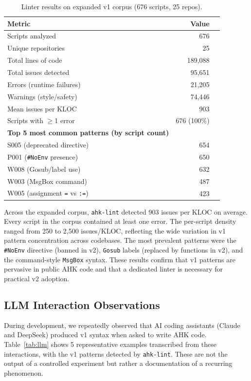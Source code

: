 \documentclass[11pt,a4paper]{article}
\begin{document}
\begin{enumerate}
\begin{table}[h]
\centering\small
\caption{Linter results on expanded v1 corpus (676 scripts, 25 repos).}
\label{tab:corpus_expanded}
\begin{tabular}{lrr}
\toprule
\textbf{Metric} & \textbf{Value} \\
\midrule
Scripts analyzed & 676 \\
Unique repositories & 25 \\
Total lines of code & 189,088 \\
Total issues detected & 95,651 \\
\quad Errors (runtime failures) & 21,205 \\
\quad Warnings (style/safety) & 74,446 \\
Mean issues per KLOC & 903 \\
Scripts with $\ge$1 error & 676 (100\%) \\
\midrule
\textbf{Top 5 most common patterns (by script count)} \\
\quad S005 (deprecated directive) & 654 \\
\quad P001 (\texttt{\#NoEnv} presence) & 650 \\
\quad W008 (Gosub/label use) & 632 \\
\quad W003 (MsgBox command) & 487 \\
\quad W005 (assignment \texttt{=} vs \texttt{:=}) & 423 \\
\bottomrule
\end{tabular}
\end{table}

Across the expanded corpus, \texttt{ahk-lint} detected 903 issues per KLOC on average. Every script in the corpus contained at least one error. The per-script density ranged from 250 to 2,500 issues/KLOC, reflecting the wide variation in v1 pattern concentration across codebases. The most prevalent patterns were the \texttt{\#NoEnv} directive (banned in v2), \texttt{Gosub} labels (replaced by functions in v2), and the command-style \texttt{MsgBox} syntax. These results confirm that v1 patterns are pervasive in public AHK code and that a dedicated linter is necessary for practical v2 adoption.

\subsection{LLM Interaction Observations}

During development, we repeatedly observed that AI coding assistants (Claude and DeepSeek) produced v1 syntax when asked to write AHK code. Table~\ref{tab:llm} shows 5 representative examples transcribed from these interactions, with the v1 patterns detected by \texttt{ahk-lint}. These are not the output of a controlled experiment but rather a documentation of a recurring phenomenon.


\end{enumerate}
\end{document}
